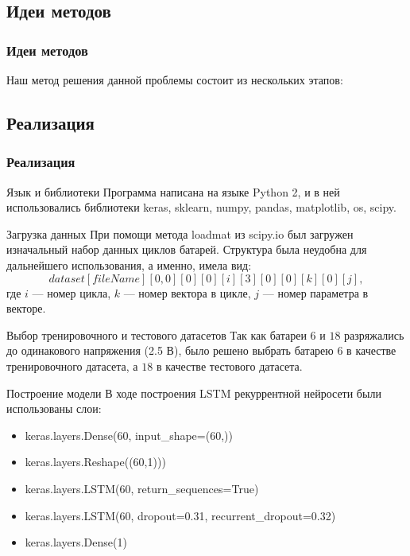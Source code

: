 \documentclass[12pt]{beamer}
\begin{document}
\subsection{Идеи методов}
\begin{frame}
  \frametitle{Идеи методов}
  \begin{block}{Наш метод решения данной проблемы состоит из нескольких этапов:}

  \end{block}
\end{frame}
\subsection{Реализация}
\begin{frame}
  \frametitle{Реализация}
  \begin{block}{Язык и библиотеки}
  Программа написана на языке Python 2, и в ней использовались библиотеки keras, sklearn, numpy, pandas, matplotlib, os, scipy.
  \end{block}
\end{frame}
\begin{frame}
  \begin{block}{Загрузка данных}
    При помощи метода loadmat из scipy.io был загружен изначальный набор данных циклов батарей. Структура была неудобна для дальнейшего использования, а именно, имела вид: \\
      \begin{displaymath}
      dataset[fileName][0, 0][0][0][i][3][0][0][k][0][j],
      \end{displaymath}
    где $i$ --- номер цикла, $k$ --- номер вектора в цикле, $j$ --- номер параметра в векторе.
  \end{block}
\end{frame}
\begin{frame}
  \begin{block}{Выбор тренировочного и тестового датасетов}
   Так как батареи $6$ и $18$ разряжались до одинакового напряжения (2.5 В), было решено выбрать батарею $6$ в качестве тренировочного датасета, а $18$ в качестве тестового датасета.
  \end{block}
\end{frame}
\begin{frame}
  \begin{block}{Построение модели}
    В ходе построения LSTM рекуррентной нейросети были использованы слои: 
  \begin{itemize}
      \item[] keras.layers.Dense(60, input\_shape=(60,))
      \item[] keras.layers.Reshape((60,1)))
      \item[] keras.layers.LSTM(60, return\_sequences=True)
      \item[] keras.layers.LSTM(60, dropout=0.31, recurrent\_dropout=0.32)
      \item[] keras.layers.Dense(1)
  \end{itemize}
  \end{block}
\end{frame}
\end{document}
